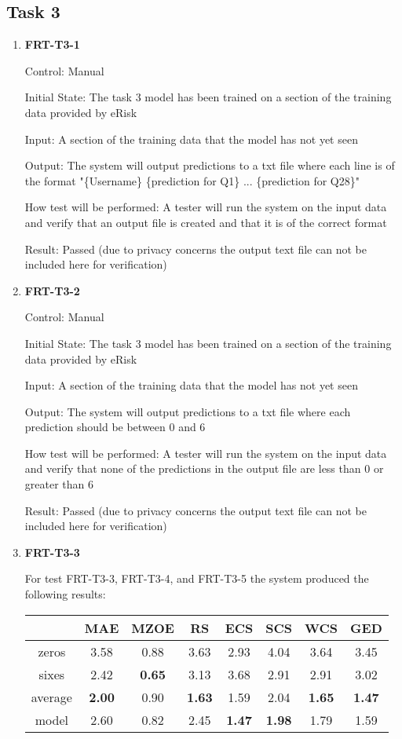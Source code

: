 \documentclass[12pt, titlepage]{article}
\begin{document}
\subsection{Task 3}
\begin{enumerate}
\item \textbf{FRT-T3-1}


Control: Manual


Initial State: The task 3 model has been trained on a section of the training data provided by eRisk


Input: A section of the training data that the model has not yet seen


Output: The system will output predictions to a txt file where each line is of the format "\{Username\} \{prediction for Q1\} ... \{prediction for Q28\}"


How test will be performed: A tester will run the system on the input data and verify that an output file is created and that it is of the correct format


Result: Passed (due to privacy concerns the output text file can not be included here for verification)


\item \textbf{FRT-T3-2}


Control: Manual


Initial State: The task 3 model has been trained on a section of the training data provided by eRisk


Input: A section of the training data that the model has not yet seen


Output: The system will output predictions to a txt file where each prediction should be between 0 and 6


How test will be performed: A tester will run the system on the input data and verify that none of the predictions in the output file are less than 0 or greater than 6


Result: Passed (due to privacy concerns the output text file can not be included here for verification)


\item \textbf{FRT-T3-3}


For test FRT-T3-3, FRT-T3-4, and FRT-T3-5 the system produced the following results:


\begin{tabular}{c|ccccccc}
 &  MAE   & MZOE  & RS    & ECS   & SCS   & WCS   & GED \\ \hline
zeros  & 3.58  & 0.88  & 3.63  & 2.93  & 4.04  & 3.64  & 3.45 \\
sixes  & 2.42  & \textbf{0.65}  & 3.13  & 3.68  & 2.91  & 2.91  & 3.02 \\
average & \textbf{2.00}  & 0.90  & \textbf{1.63}  & 1.59  & 2.04  & \textbf{1.65}  & \textbf{1.47} \\
model  & 2.60  & 0.82  & 2.45  & \textbf{1.47}  & \textbf{1.98}  & 1.79  & 1.59 \\
\end{tabular}



\end{enumerate}
\end{document}

